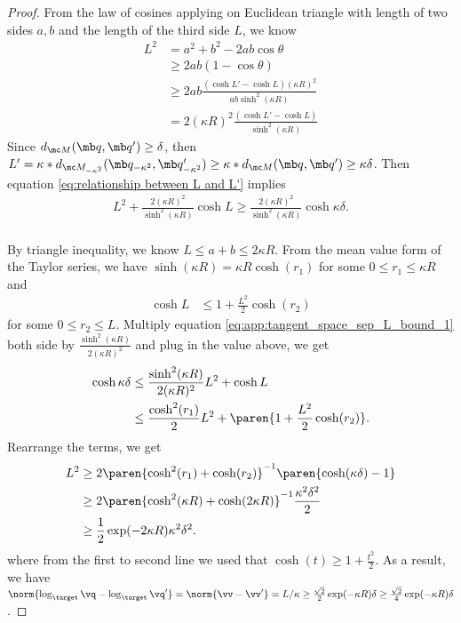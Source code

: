 \begin{proof}
From the law of cosines applying on Euclidean triangle with length of two sides $a,b$ and the length of the third side $L$, we know
\begin{equation}\label{eq:relationship between L and L'}
    \begin{aligned}
        L^2 
        &= a^2 + b^2 - 2ab \cos \theta\\
        &\geq 2ab(1-\cos\theta)\\
        &\geq 2ab \frac{(\cosh L' - \cosh L)(\kappa R)^2}{ab\sinh^2(\kappa R)}\\
        &= 2(\kappa R)^2 \frac{(\cosh L' - \cosh L)}{\sinh^2(\kappa R)}
    \end{aligned}
\end{equation}
Since $d_{\mc M}(\mb q,\mb q')\geq \delta$, then $L' = \kappa *  d_{\mc M_{-\kappa^2}}(\mb q_{-\kappa^2}, \mb q_{-\kappa^2}') \geq \kappa * d_{\mc M}(\mb q,\mb q')\geq \kappa\delta$. Then equation \eqref{eq:relationship between L and L'} implies 
\begin{align}\label{eq:app:tangent_space_sep_L_bound_1}
    L^2 + \frac{2(\kappa R)^2}{\sinh^2(\kappa R)}\cosh L \geq \frac{2(\kappa R)^2}{\sinh^2(\kappa R)} \cosh \kappa\delta.
\end{align}
\vspace{.1in}\\
By triangle inequality, we know $L \leq a + b \leq 2\kappa R$. From the mean value form of the Taylor series, we have $\sinh(\kappa R) = \kappa R \cosh(r_1)$ for some $0 \le r_1 \le \kappa R$ and 
\begin{align}
    \cosh L &\le 1 + \frac{L^2}{2} \cosh(r_2)
\end{align}
for some $0 \le r_2 \le L$. Multiply equation \eqref{eq:app:tangent_space_sep_L_bound_1} both side by $\frac{\sinh^2(\kappa R)}{2(\kappa R)^2}$ and plug in the value above, we get
\begin{align}
\cosh \kappa\delta &\le \frac{\sinh^2(\kappa R)}{2(\kappa R)^2}L^2 + \cosh L \\
&\le \frac{\cosh^2(r_1)}{2}L^2 + \paren{1 + \frac{L^2}{2}\cosh(r_2)}.
\end{align}
Rearrange the terms, we get
\begin{align}
    L^2 &\ge 2\paren{\cosh^2(r_1) + \cosh(r_2)}^{-1} \paren{\cosh(\kappa \delta) - 1} \\
    &\ge 2\paren{\cosh^2(\kappa R) + \cosh(2\kappa R)}^{-1} \frac{\kappa^2 \delta^2}{2} \\
    &\ge \frac{1}{2} \exp(-2\kappa R) \kappa^2 \delta^2.\\
\end{align}
where from the first to second line we used that $\cosh(t) \ge 1 + \frac{t^2}{2}$. 
As a result, we have $\norm{\log_{\target}\vq - \log_{\target}\vq'} = \norm{\vv - \vv'} = L/\kappa \ge \frac{\sqrt{2}}{2}\exp(-\kappa R)\delta \ge \frac{\sqrt{2}}{4}\exp(-\kappa R)\delta$.
\end{proof}

